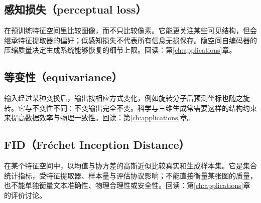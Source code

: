 \subsection*{感知损失（perceptual loss）}\label{gl:perceptual}
在预训练特征空间里比较图像，而不只比较像素。它能更关注某些可见结构，但会继承特征提取器的偏好；低感知损失不代表所有信息无损保存。隐空间自编码器的压缩质量决定生成系统能够恢复的细节上限。回读：第\ref{ch:applications}章。

\subsection*{等变性（equivariance）}\label{gl:equivariance}
输入经过某种变换后，输出按相应方式变化，例如旋转分子后预测坐标也随之旋转。它与不变性不同：不变输出完全不变。科学与三维生成常需要这样的结构约束来提高数据效率与物理一致性。回读：第\ref{ch:applications}章。

\subsection*{FID（Fr\'echet Inception Distance）}\label{gl:fid}
在某个特征空间中，以均值与协方差的高斯近似比较真实和生成样本集。它是集合统计指标，受特征提取器、样本量与评估协议影响；不能直接衡量某张图的质量，也不能单独衡量文本准确性、物理合理性或安全性。回读：第\ref{ch:applications}章的评价讨论。
